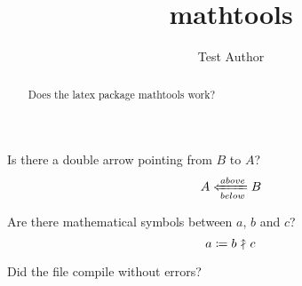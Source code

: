 \documentclass{snapshotmfo}
\author{Test Author}
\title{mathtools}
\begin{document}
\begin{abstract}
Does the latex package mathtools work?
\end{abstract}

Is there a double arrow pointing from $B$ to $A$?
\[ A \xLeftarrow[below]{above} B \]

Are there mathematical symbols between $a$, $b$ and $c$?
$$a \coloneqq b \nuparrow c$$

Did the file compile without errors?
\end{document}
